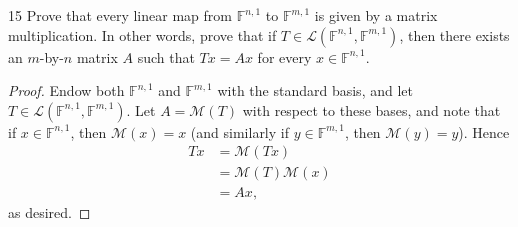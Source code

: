 \documentclass[11pt]{extarticle}
\newenvironment{problem}[1]{\begin{prob*}{#1}{}}{\end{prob*}}
\newcommand{\F}{\mathbb{F}}
\newcommand{\mat}{\mathcal{M}}
\newcommand{\Hom}{\mathcal{L}}
\begin{document}
\begin{problem}{15}
Prove that every linear map from $\F^{n,1}$ to $\F^{m,1}$ is given by a matrix multiplication.  In other words, prove that if $T\in\Hom(\F^{n,1}, \F^{m,1})$, then there exists an $m$-by-$n$ matrix $A$ such that $Tx=Ax$ for every $x\in\F^{n,1}$.
\end{problem}
\begin{proof}
Endow both $\F^{n,1}$ and $\F^{m,1}$ with the standard basis, and let $T\in\Hom(\F^{n,1}, \F^{m,1})$.  Let $A=\mat(T)$ with respect to these bases, and note that if $x\in\F^{n,1}$, then $\mat(x) = x$ (and similarly if $y\in\F^{m,1}$, then $\mat(y) = y$).  Hence
\begin{align*}
Tx &= \mat(Tx)\\
&= \mat(T)\mat(x)\\
&= Ax,
\end{align*}
as desired.
\end{proof}
\end{document}

